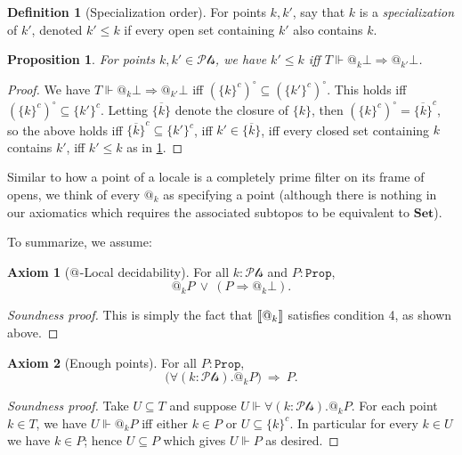 \documentclass[11pt, oneside, article]{memoir}
\makeatletter
\theoremstyle{plain}
\newtheorem{proposition}[theorem]{Proposition}
\theoremstyle{definition}
\newtheorem{definition}[theorem]{Definition}
\newtheorem{axiom}{Axiom}
\theoremstyle{remark}
\newenvironment{soundproof}{\begin{proof}[Soundness proof]}{\end{proof}}
\renewcommand{\ss}{\subseteq}
\DeclarePairedDelimiter{\church}{\llbracket}{\rrbracket}
\newcommand{\const}[1]{\mathtt{#1}}
\newcommand{\Cat}[1]{\mathbf{#1}}
\newcommand{\ol}[1]{\overline{#1}}
\newcommand{\forces}{\Vdash}
\newcommand{\prop}{\const{Prop}}
\newcommand{\pt}{k}				%
\newcommand{\Pts}{\mathcal{Pts}}		%
\newcommand{\AtSymbol}{{@}}
\newcommand{\At}[1][\pt]{\AtSymbol_{#1}}
\newcommand{\imp}{\Rightarrow}
\newcommand{\false}{\bot}
\makeatother
\begin{document}
\begin{definition}[Specialization order]\label{def.specialization}
For points $\pt,\pt'$, say that $\pt$ is a \emph{specialization} of $\pt'$, denoted $\pt'\leq\pt$ if every open set containing $\pt'$ also contains $\pt$.
\end{definition}

\begin{proposition}\label{prop.specialization}
For points $\pt,\pt'\in\Pts$, we have $\pt'\leq\pt$ iff $T\forces\At\false\imp\At[\pt']\false$.
\end{proposition}
\begin{proof}
We have $T\forces\At\false\imp\At[\pt']\false$ iff $(\{\pt\}^c)^\circ\ss(\{\pt'\}^c)^\circ$. This holds iff $(\{\pt\}^c)^\circ\ss\{\pt'\}^c$. Letting $\ol{\{\pt\}}$ denote the closure of $\{\pt\}$, then $(\{\pt\}^c)^\circ=\ol{\{\pt\}}^c$, so the above holds iff $\ol{\{\pt\}}^c\ss\{\pt'\}^c$, iff $\pt'\in\ol{\{\pt\}}$, iff every closed set containing $\pt$ contains $\pt'$, iff $\pt'\leq\pt$ as in \cref{def.specialization}.
\end{proof}


\medskip

Similar to how a point of a locale is a completely prime filter on its frame of opens, we think of every $\At $ as specifying a point (although there is nothing in our axiomatics which requires the associated subtopos to be equivalent to $\Cat{Set}$). 

To summarize, we assume:

\begin{axiom}[{$\At[]$-Local decidability}]\label{ax.local_dec}
	For all $\pt : \Pts$ and $P : \prop$,
	\[
		\At P \: \lor \: (P \imp \At \bot).
	\]
\end{axiom}

\begin{soundproof}
This is simply the fact that $\church{\At}$ satisfies condition 4, as shown above.
\end{soundproof}

\begin{axiom}[Enough points]\label{ax.enough_pts}
	For all $P : \prop$,
	\[
		\big( \forall (\pt : \Pts). \At P \big) \: \Rightarrow \: P.
	\]
\end{axiom}

\begin{soundproof}
Take $U\ss T$ and suppose $U\forces\forall (\pt : \Pts). \At P$. For each point $\pt\in T$, we have $U\forces\At P$ iff either $\pt\in P$ or $U\ss\{\pt\}^c$. In particular for every $\pt\in U$ we have $\pt\in P$; hence $U\ss P$ which gives $U\forces P$ as desired.
\end{soundproof}
\end{document}
